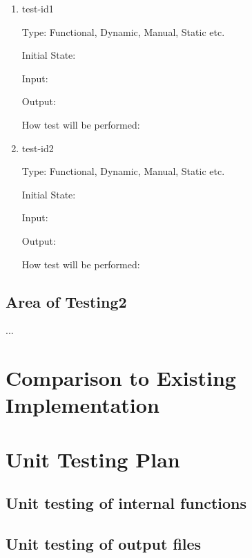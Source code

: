 \documentclass[12pt, titlepage]{article}
\begin{document}
\begin{enumerate}

\item{test-id1\\}

Type: Functional, Dynamic, Manual, Static etc.
                    
Initial State: 
                    
Input: 
                    
Output: 
                    
How test will be performed: 
                    
\item{test-id2\\}

Type: Functional, Dynamic, Manual, Static etc.
                    
Initial State: 
                    
Input: 
                    
Output: 
                    
How test will be performed: 

\end{enumerate}

\subsection{Area of Testing2}

...

    
\section{Comparison to Existing Implementation} 
                
\section{Unit Testing Plan}
        
\subsection{Unit testing of internal functions}
        
\subsection{Unit testing of output files}       


\end{document}
